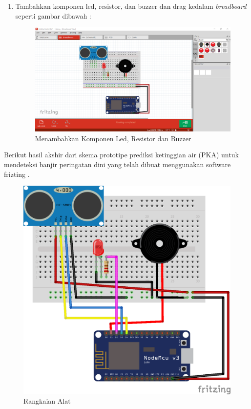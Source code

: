 \begin{enumerate}
    \item Tambahkan komponen led, resistor, dan buzzer dan drag kedalam \textit{breadboard} seperti gambar dibawah :
    \begin{figure}[H]
    \centering
    \includegraphics[width=1.1\textwidth]{figures/tutor8.png}
    \caption{Menambahkan Komponen Led, Resistor dan Buzzer }
    \label{print}
    \end{figure}
\end{enumerate}

\par Berikut hasil akshir dari skema prototipe prediksi ketinggian air (PKA) untuk mendeteksi banjir peringatan dini yang telah dibuat menggunakan software frizting .

\begin{figure}[H]
\centering
\includegraphics[width=1\textwidth]{figures/rangkaian.png}
\caption{Rangkaian Alat  }
\label{print}
\end{figure}
    

